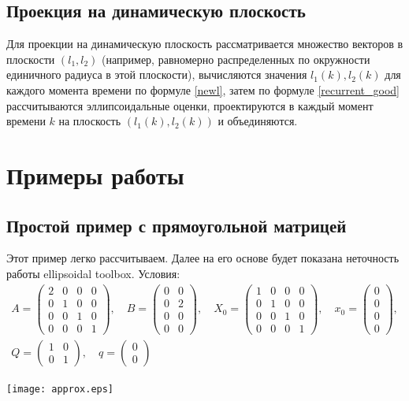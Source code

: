 \documentclass[10pt, a4paper]{article}
\begin{document}
\subsection{Проекция на динамическую плоскость}
Для проекции на динамическую плоскость рассматривается множество векторов в плоскости $(l_1,l_2)$ (например, равномерно распределенных по окружности единичного радиуса в этой плоскости), вычисляются значения $l_1(k), l_2(k)$ для каждого момента времени по формуле \eqref{newl}, затем по формуле \eqref{recurrent_good} рассчитываются эллипсоидальные оценки, проектируются в каждый момент времени $k$ на плоскость $(l_1(k),l_2(k))$ и объединяются.

\section{Примеры работы}
\subsection{Простой пример с прямоугольной матрицей}
Этот пример легко рассчитываем. Далее на его основе будет показана неточность работы ellipsoidal toolbox.
Условия:
\begin{gather*} A = \left(\begin{array}{cccc} 2 & 0 & 0 & 0\\ 0 & 1 & 0 & 0\\ 0 & 0 & 1 & 0\\ 0 & 0 & 0 & 1 \end{array}\right),\quad 
B = \left(\begin{array}{cc} 0 & 0\\ 0 & 2\\ 0 & 0\\ 0 & 0 \end{array}\right),\quad 
X_0 = \left(\begin{array}{cccc} 1 & 0 & 0 & 0\\ 0 & 1 & 0 & 0\\ 0 & 0 & 1 & 0\\ 0 & 0 & 0 & 1 \end{array}\right),\quad 
x_0 = \left(\begin{array}{c} 0\\ 0\\ 0\\ 0 \end{array}\right), \\
Q = \left(\begin{array}{cc} 1 & 0\\ 0 & 1 \end{array}\right), \quad
q = \left(\begin{array}{c} 0\\ 0 \end{array}\right)
\end{gather*} 

\texttt{[image: approx.eps]}
\end{document}
